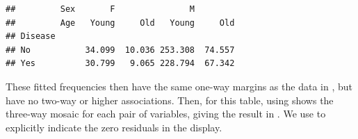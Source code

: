 \documentclass[11pt]{book}
\renewenvironment{knitrout}{\small\renewcommand{\baselinestretch}{.85}}{} %
\begin{document}
\begin{knitrout}
\color{fgcolor}\begin{kframe}
\begin{alltt}
 \hlkwb{<-} \hlstd{(}\hlopt{~}\hlopt{+}\hlopt{+}  \hlstd{=}\hlstd{)}
 \hlkwb{<-} \hlstd{(}
\hlopt{+} \hlopt{~} 
\end{alltt}
\begin{verbatim}
##         Sex       F               M        
##         Age   Young     Old   Young     Old
## Disease                                    
## No           34.099  10.036 253.308  74.557
## Yes          30.799   9.065 228.794  67.342
\end{verbatim}
\end{kframe}
\end{knitrout}
These fitted frequencies then have the same one-way margins as the
data in , but have no two-way or higher associations.
Then,  for this table, using 
shows the three-way mosaic for each pair of variables, giving
the result in .  We use 
to explicitly indicate the zero residuals in the display.
\end{document}
